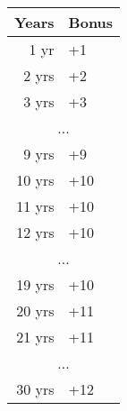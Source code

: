 \begin{tabular}{rl}
Years & Bonus \\
\hline
1 yr & +1 \\
2 yrs & +2 \\
3 yrs & +3 \\
\multicolumn{2}{c}{...} \\
9 yrs & +9 \\
10 yrs & +10 \\
11 yrs & +10 \\
12 yrs & +10 \\
\multicolumn{2}{c}{...} \\
19 yrs & +10 \\
20 yrs & +11 \\
21 yrs & +11 \\
\multicolumn{2}{c}{...} \\
30 yrs & +12 \\
\end{tabular}